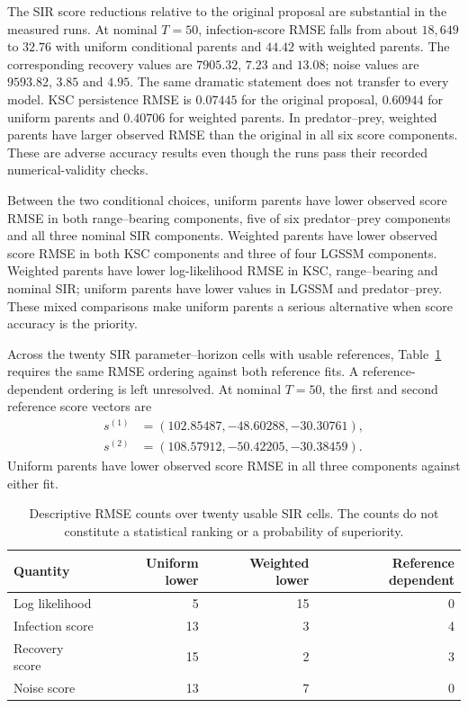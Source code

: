  {}
 {}

The SIR score reductions relative to the original proposal are substantial
in the measured runs. At nominal $T=50$, infection-score RMSE falls from
about $18{,}649$ to $32.76$ with uniform conditional parents and $44.42$
with weighted parents. The corresponding recovery values are $7905.32$,
$7.23$ and $13.08$; noise values are $9593.82$, $3.85$ and $4.95$.
The same dramatic statement does not transfer to every model. KSC persistence
RMSE is $0.07445$ for the original proposal, $0.60944$ for uniform parents
and $0.40706$ for weighted parents. In predator--prey, weighted parents have
larger observed RMSE than the original in all six score components. These
are adverse accuracy results even though the runs pass their recorded
numerical-validity checks.

Between the two conditional choices, uniform parents have lower observed
score RMSE in both range--bearing components, five of six predator--prey
components and all three nominal SIR components. Weighted parents have lower
observed score RMSE in both KSC components and three of four LGSSM
components. Weighted parents have lower log-likelihood RMSE in KSC,
range--bearing and nominal SIR; uniform parents have lower values in LGSSM
and predator--prey. These mixed comparisons make uniform parents a serious
alternative when score accuracy is the priority.

Across the twenty SIR parameter--horizon cells with usable references,
Table~\ref{tab:parent-sir-allocation-counts} requires the same RMSE ordering
against both reference fits. A reference-dependent ordering is left unresolved.
At nominal $T=50$, the first and second reference score vectors are
\begin{align*}
  s^{(1)} &= (102.85487,-48.60288,-30.30761),\\
  s^{(2)} &= (108.57912,-50.42205,-30.38459).
\end{align*}
Uniform parents have lower observed score RMSE in all three components
against either fit.

\begin{table}[htbp]
\centering\small
\begin{tabular}{lrrr}
\toprule
Quantity & Uniform lower & Weighted lower & Reference dependent\\
\midrule
Log likelihood & 5 & 15 & 0\\
Infection score & 13 & 3 & 4\\
Recovery score & 15 & 2 & 3\\
Noise score & 13 & 7 & 0\\
\bottomrule
\end{tabular}
\caption{Descriptive RMSE counts over twenty usable SIR cells. The counts do
not constitute a statistical ranking or a probability of superiority.}
\label{tab:parent-sir-allocation-counts}
\end{table}

